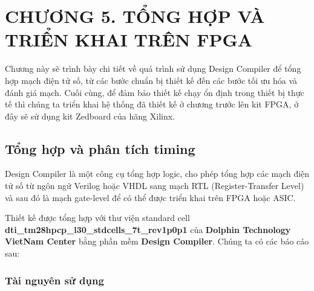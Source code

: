 \section*{CHƯƠNG 5. TỔNG HỢP VÀ TRIỂN KHAI TRÊN FPGA} \label{chuong5}
\setcounter{section}{5}
\setcounter{subsection}{0}
\setcounter{figure}{0}
\setcounter{table}{0}
Chương này sẽ trình bày chi tiết về quá trình sử dụng Design Compiler để tổng hợp mạch điện tử số, từ các bước chuẩn bị thiết kế đến các bước tối ưu hóa và đánh giá mạch. Cuối cùng, để đảm bảo thiết kế chạy ổn định trong thiết bị thực tế thì chúng ta triển khai hệ thống đã thiết kế ở chương trước lên kit FPGA, ở đây sẽ sử dụng kit Zedboard của hãng Xilinx.

\subsection{Tổng hợp và phân tích timing}
Design Compiler là một công cụ tổng hợp logic, cho phép tổng hợp các mạch điện tử số từ ngôn ngữ Verilog hoặc VHDL sang mạch RTL (Register-Transfer Level) và sau đó là mạch gate-level để có thể được triển khai trên FPGA hoặc ASIC. 

Thiết kế được tổng hợp với thư viện standard cell \textbf{dti\_tm28hpcp\_l30\_stdcells\_7t\_rev1p0p1} của \textbf{Dolphin Technology VietNam Center} bằng phần mềm \textbf{Design Compiler}. Chúng ta có các báo cáo sau:
\subsubsection{Tài nguyên sử dụng}


